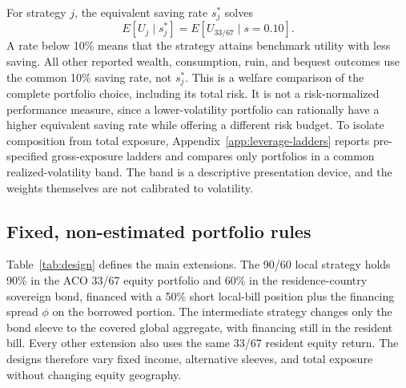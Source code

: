 \documentclass[11pt]{article}
\begin{document}
For strategy $j$, the equivalent saving rate $s_j^*$ solves
\begin{equation}
 E[U_j\mid s_j^*]
 =E[U_{33/67}\mid s=0.10].
 \label{eq:eqsaving}
\end{equation}
A rate below 10\% means that the strategy attains benchmark utility with less
saving. All other reported wealth, consumption, ruin, and bequest outcomes use
the common 10\% saving rate, not $s_j^*$.
This is a welfare comparison of the complete portfolio choice, including its
total risk. It is not a risk-normalized performance measure, since a
lower-volatility portfolio can rationally have a higher equivalent saving rate
while offering a different risk budget. To isolate composition from total
exposure, Appendix~\ref{app:leverage-ladders} reports pre-specified
gross-exposure ladders and compares only portfolios in a common
realized-volatility band. The band is a descriptive presentation device, and
the weights themselves are not calibrated to volatility.

\subsection{Fixed, non-estimated portfolio rules}
\label{sec:portfolio-rules}

Table~\ref{tab:design} defines the main extensions. The 90/60 local strategy
holds 90\% in the ACO 33/67 equity portfolio and 60\% in the residence-country
sovereign bond, financed with a 50\% short local-bill position plus the
financing spread $\phi$ on the borrowed portion. The intermediate
strategy changes only the bond sleeve to the covered global aggregate, with
financing still in the resident bill. Every other extension also uses the
same 33/67 resident equity return. The designs therefore vary fixed income,
alternative sleeves, and total exposure without changing equity geography.
\end{document}
